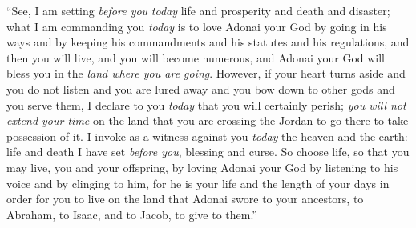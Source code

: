 \begin{biblechapter}
\verse “See, I am setting \textit{before you} \textit{today} life and prosperity and death and disaster;
\verse what I am commanding you \textit{today} is to love Adonai your God by going in his ways and by keeping his commandments and his statutes and his regulations, and then you will live, and you will become numerous, and Adonai your God will bless you in the \textit{land where you are going}.
\verse However, if your heart turns aside and you do not listen and you are lured away and you bow down to other gods and you serve them,
\verse I declare to you \textit{today} that you will certainly perish; \textit{you will not extend your time} on the land that you are crossing the Jordan to go there to take possession of it.
\verse I invoke as a witness against you \textit{today} the heaven and the earth: life and death I have set \textit{before you}, blessing and curse. So choose life, so that you may live, you and your offspring,
\verse by loving Adonai your God by listening to his voice and by clinging to him, for he is your life and the length of your days in order for you to live on the land that Adonai swore to your ancestors, to Abraham, to Isaac, and to Jacob, to give to them.”
\end{biblechapter}


